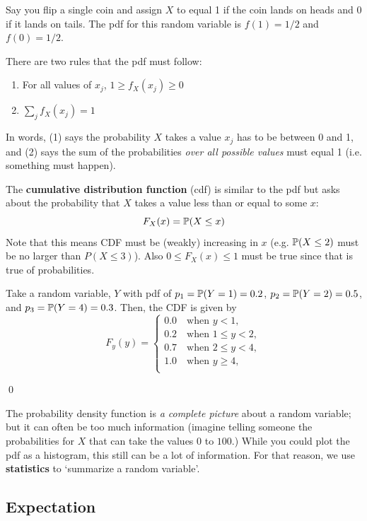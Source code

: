\documentclass[12pt]{article}
\begin{document}
\begin{example}
  Say you flip a single coin and assign $X$ to equal 1 if the coin lands on heads and 0 if it lands on tails. The pdf for this random variable is $f(1) = 1/2$ and $f(0) = 1/2$.
\end{example}

There are two rules that the pdf must follow:
\begin{enumerate}
  \item For all values of $x_j$, $1 \geq f_{X}(x_j) \geq 0$
  \item $\sum_{j} f_{X}(x_j) = 1$
\end{enumerate}
In words, (1) says the probability $X$ takes a value $x_j$ has to be between 0 and 1, and (2) says the sum of the probabilities \emph{over all possible values} must equal 1 (i.e. something must happen).


The \textbf{cumulative distribution function} (cdf) is similar to the pdf but asks about the probability that $X$ takes a value less than or equal to some $x$:
$$
  F_{X}(x) = \P(X \leq x)
$$
Note that this means CDF must be (weakly) increasing in $x$ (e.g. $\P(X \leq 2)$ must be no larger than $P(X \leq 3)$). Also $0 \leq F_{X}(x) \leq 1$ must be true since that is true of probabilities.

\begin{example}
  Take a random variable, $Y$ with pdf of $p_1 = \P{Y = 1} = 0.2$, $p_2 = \P{Y = 2} = 0.5$, and $p_3 = \P{Y = 4} = 0.3$. Then, the CDF is given by
  $$
    F_{y}(y) = \begin{cases}
      0.0   \quad \text{when } y < 1, \\
      0.2 \quad \text{when } 1 \leq y < 2, \\
      0.7 \quad \text{when } 2 \leq y < 4, \\
      1.0   \quad \text{when } y \geq 4, \\
    \end{cases}
  $$

  \qed
\end{example}

The probability density function is \emph{a complete picture} about a random variable; but it can often be too much information (imagine telling someone the probabilities for $X$ that can take the values $0$ to $100$.) While you could plot the pdf as a histogram, this still can be a lot of information. For that reason, we use \textbf{statistics} to `summarize a random variable'.

\subsection*{Expectation}
\end{document}
